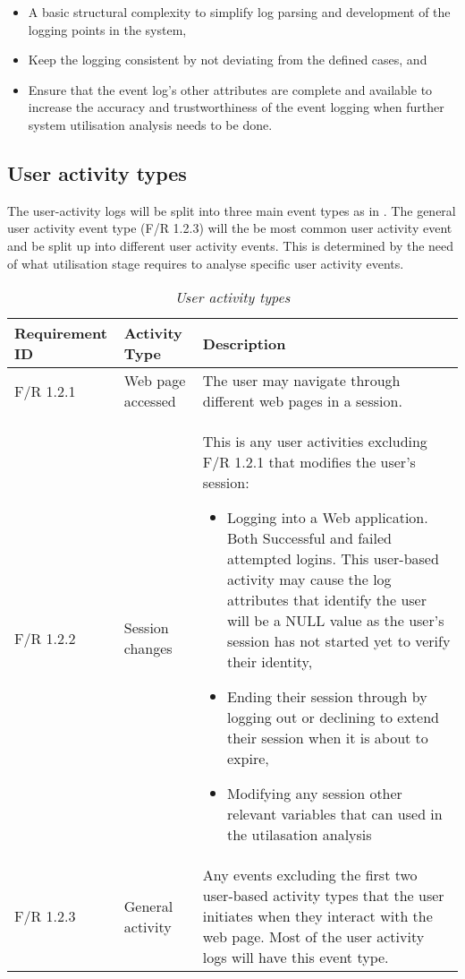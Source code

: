 \begin{itemize}
	\item A basic structural complexity to simplify log parsing and development of the logging points in the system,
	\item Keep the logging consistent by not deviating from the defined cases, and
	\item Ensure that the event log's other attributes are complete and available to increase the accuracy and trustworthiness of the event logging when further system utilisation analysis needs to be done. 
\end{itemize}

\subsection{User activity types}\label{sec:ch2_userActivityTypes}
The user-activity logs will be split into three main event types as in . The general user activity event type (F/R 1.2.3) will the be most common user activity event and be split up into different user activity events. This is determined by the need of what utilisation stage requires to analyse specific user activity events. 

\begin{table}[!htb]
	\centering
	\caption[User activity types]
	{\textit{User activity types}}
	\label{tbl:ch2_userActivityTypes}
	\begin{tabularx}{\textwidth}{|l|l|X|}
		\hline \textbf{Requirement ID} & \textbf{Activity Type} & \textbf{Description} \\
		\hline F/R 1.2.1 & Web page accessed & The user may navigate through different web pages in a session.\\
		\hline F/R 1.2.2 & Session changes & This is any user activities excluding F/R 1.2.1 that modifies the user's session:
		\begin{itemize}
			\item Logging into a Web application. Both Successful and failed attempted logins. This user-based activity may cause the log attributes that identify the user will be a NULL value as the user's session has not started yet to verify their identity,
			\item Ending their session through by logging out or declining to extend their session when it is about to expire,
			\item Modifying any session other relevant variables that can used in the utilasation analysis
		\end{itemize}\\
		\hline F/R 1.2.3 & General activity & Any events excluding the first two user-based activity types that the user initiates when they interact with the web page. Most of the user activity logs will
		have this event type.\\ 
		\hline
	\end{tabularx}
\end{table}

